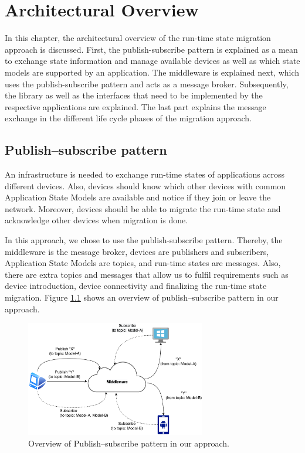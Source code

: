 \chapter{Architectural Overview}
\label{ch:architectural_overview}
In this chapter, the architectural overview of the run-time state migration approach is discussed. First, the publish-subscribe pattern is explained as a mean to exchange state information and manage available devices as well as which state models are supported by an application. The middleware is explained next, which uses the publish-subscribe pattern and acts as a message broker. Subsequently, the library as well as the interfaces that need to be implemented by the respective applications are explained. The last part explains the message exchange in the different life cycle phases of the migration approach.

\section{Publish–subscribe pattern}
An infrastructure is needed to exchange run-time states of applications across different devices. Also, devices should know which other devices with common Application State Models are available and notice if they join or leave the network. Moreover, devices should be able to migrate the run-time state and acknowledge other devices when migration is done.

In this approach, we chose to use the publish-subscribe pattern. Thereby, the middleware is the message broker, devices are publishers and subscribers, Application State Models are topics, and run-time states are messages. Also, there are extra topics and messages that allow us to fulfil requirements such as device introduction, device connectivity and finalizing the run-time state migration. Figure \ref{fig:publish–subscribe} shows an overview of publish–subscribe pattern in our approach.

\vspace{10mm}
\FloatBarrier \begin{figure}[H]
    \includegraphics[width=0.7\textwidth]{../figures/publish-subscribe.pdf}
    \centering
    \caption{Overview of Publish–subscribe pattern in our approach.}
    \label{fig:publish–subscribe}
\end{figure} \FloatBarrier

